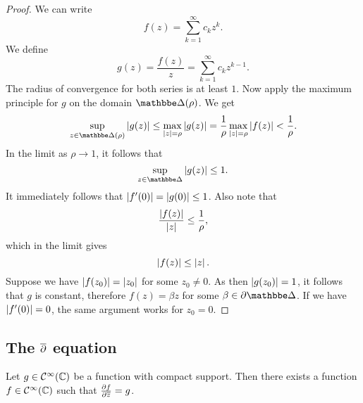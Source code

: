 \begin{proof}
We can write
\[
f(z) = \sum_{k=1}^\infty c_k z^k.
\]
We define
\[
g(z) = \frac{f(z)}{z} = \sum_{k=1}^\infty c_k z^{k-1}.
\]
The radius of convergence for both series is at least $1$. Now
apply the maximum principle for $g$ on the domain $\dsk(\rho)$. We
get
\[
\sup_{z \in \dsk(\rho)} \abs{g(z)} \leq
\max_{\abs{z} = \rho} \abs{g(z)} =
\frac{1}{\rho} \max_{\abs{z} = \rho} \abs{f(z)} <
\frac{1}{\rho}.
\]
In the limit as $\rho \to 1$, it follows that
\[
\sup_{z \in \dsk} \abs{g(z)} \leq 1.
\]
It immediately follows that $\left\lvert f'(0)\right\rvert = \left\lvert g(0)\right\rvert \leq 1$. Also
note that
\[
\frac{\left\lvert f(z)\right\rvert}{\left\lvert z\right\rvert} \leq \frac{1}{\rho},
\]
which in the limit gives
\[
\left\lvert f(z)\right\rvert \leq \left\lvert z\right\rvert.
\]
Suppose we have $\left\lvert f(z_0)\right\rvert = \left\lvert z_0\right\rvert$ for some $z_0 \ne 0$. As
then $\left\lvert g(z_0)\right\rvert = 1$, it follows that $g$ is constant, therefore
$f(z) = \beta z$ for some $\beta \in \partial \dsk$. If we have
$\left\lvert f'(0)\right\rvert = 0$, the same argument works for $z_0 = 0$.
\end{proof}

\newpage

\subsection{The \texorpdfstring{$\overline{\partial}$}{d} equation}

\begin{lema}
\label{hol:lm:bound_diff}
Let $g \in \mathcal{C}^\infty(\mathbb{C})$ be a function with compact
support. Then there exists a function
$f \in \mathcal{C}^\infty(\mathbb{C})$ such that $\frac{\partial f}{\partial \overline{z}} = g$.
\end{lema}

